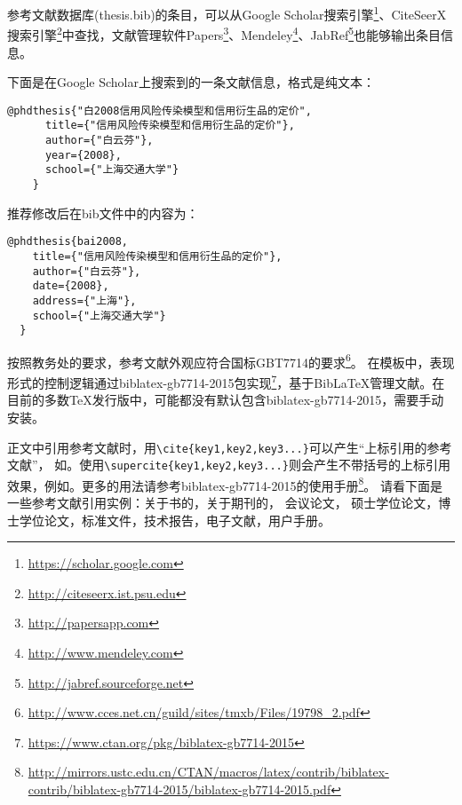 参考文献数据库(thesis.bib)的条目，可以从Google Scholar搜索引擎\footnote{\url{https://scholar.google.com}}、CiteSeerX搜索引擎\footnote{\url{http://citeseerx.ist.psu.edu}}中查找，文献管理软件Papers\footnote{\url{http://papersapp.com}}、Mendeley\footnote{\url{http://www.mendeley.com}}、JabRef\footnote{\url{http://jabref.sourceforge.net}}也能够输出条目信息。

下面是在Google Scholar上搜索到的一条文献信息，格式是纯文本：

\begin{lstlisting}[caption={从Google Scholar找到的参考文献条目}, label=googlescholar, escapeinside="", numbers=none]
    @phdthesis{"白2008信用风险传染模型和信用衍生品的定价",
      title={"信用风险传染模型和信用衍生品的定价"},
      author={"白云芬"},
      year={2008},
      school={"上海交通大学"}
    } 
\end{lstlisting}

推荐修改后在bib文件中的内容为：

\begin{lstlisting}[caption={修改后的参考文献条目}, label=itemok, escapeinside="", numbers=none]
  @phdthesis{bai2008,
    title={"信用风险传染模型和信用衍生品的定价"},
    author={"白云芬"},
    date={2008},
    address={"上海"},
    school={"上海交通大学"}
  } 
\end{lstlisting}

按照教务处的要求，参考文献外观应符合国标GBT7714的要求\footnote{\url{http://www.cces.net.cn/guild/sites/tmxb/Files/19798_2.pdf}}。
在模板中，表现形式的控制逻辑通过bibla­tex-gb7714-2015包实现\footnote{\url{https://www.ctan.org/pkg/biblatex-gb7714-2015}}，基于{Bib\LaTeX}管理文献。在目前的多数TeX发行版中，可能都没有默认包含biblatex-gb7714-2015，需要手动安装。

正文中引用参考文献时，用\verb+\cite{key1,key2,key3...}+可以产生“上标引用的参考文献”，
如\cite{Meta_CN,chen2007act,DPMG}。使用\verb+\supercite{key1,key2,key3...}+则会产生不带括号的上标引用效果，例如\supercite{JohnD,zhubajie,IEEE-1363}。更多的用法请参考biblatex-gb7714-2015的使用手册\footnote{\url{http://mirrors.ustc.edu.cn/CTAN/macros/latex/contrib/biblatex-contrib/biblatex-gb7714-2015/biblatex-gb7714-2015.pdf}}。
请看下面是一些参考文献引用实例：关于书的\cite{Meta_CN,JohnD,IEEE-1363}，关于期刊的\cite{chen2007act,chen2007ewi}，
会议论文\cite{DPMG,kocher99,cnproceed}，
硕士学位论文\cite{zhubajie,metamori2004}，博士学位论文\cite{shaheshang,FistSystem01,bai2008}，标准文件\cite{IEEE-1363}，技术报告\cite{NPB2}，电子文献\cite{xiaoyu2001, CHRISTINE1998}，用户手册\cite{RManual}。

